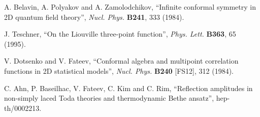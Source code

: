 \documentclass[a4paper,12pt]{article}
\begin{document}
\begin{thebibliography}{10}
%
 A. Belavin, A. Polyakov and A. Zamolodchikov, ``Infinite
conformal symmetry in 2D quantum field theory'', {\it Nucl. Phys.}
{\bf B241}, 333 (1984).

%
 J. Teschner, ``On the Liouville three-point function'',
{\it Phys. Lett.} {\bf B363}, 65 (1995).

%
 V. Dotsenko and V. Fateev, ``Conformal algebra and multipoint
correlation functions in 2D statistical models'', {\it Nucl. Phys.}
{\bf B240} [FS12], 312 (1984).

%
 C. Ahn, P. Baseilhac, V. Fateev, C. Kim and C. Rim,
``Reflection amplitudes in non-simply laced Toda theories and
thermodynamic Bethe ansatz'', hep-th/0002213.

\end{thebibliography}
\end{document}
